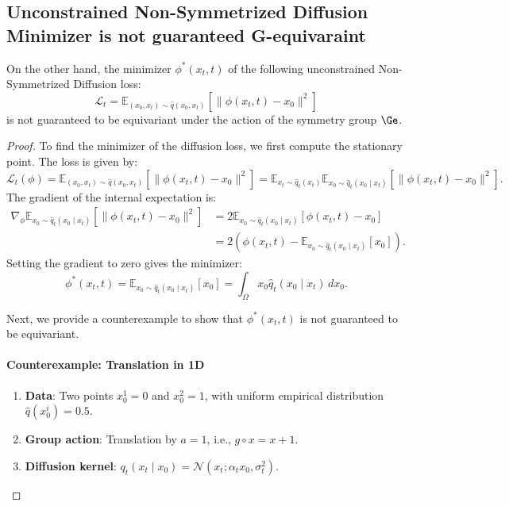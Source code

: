 \subsection{Unconstrained Non-Symmetrized Diffusion Minimizer is not guaranteed G-equivaraint}
\label{sub_app:non_sym_diff_mini}
  
On the other hand, the minimizer \(\phi^*(x_t, t)\) of the following unconstrained Non-Symmetrized Diffusion loss:
\[
    \mathcal{L}_t = \mathbb{E}_{(x_0, x_t) \sim \hat{q}(x_0, x_t)} [ \| \phi(x_t, t) - x_0 \|^2 ]
\]
is not guaranteed to be equivariant under the action of the symmetry group \(\Ge\).

\begin{proof}
To find the minimizer of the diffusion loss, we first compute the stationary point. The loss is given by:
\[
    \mathcal{L}_t(\phi) = \mathbb{E}_{(x_0, x_t) \sim \hat{q}(x_0, x_t)} \left[ \| \phi(x_t, t) - x_0 \|^2 \right] 
    = \mathbb{E}_{x_t \sim \hat{q}_t(x_t)} \mathbb{E}_{x_0 \sim \hat{q}_t(x_0 \mid x_t)} \left[ \| \phi(x_t, t) - x_0 \|^2 \right].
\]
The gradient of the internal expectation is:
\begin{align*}
    \nabla_\phi \mathbb{E}_{x_0 \sim \hat{q}_t(x_0 \mid x_t)} \left[ \| \phi(x_t, t) - x_0 \|^2 \right] 
    &= 2 \mathbb{E}_{x_0 \sim \hat{q}_t(x_0 \mid x_t)} \left[ \phi(x_t, t) - x_0 \right] \\
    &= 2 \left( \phi(x_t, t) - \mathbb{E}_{x_0 \sim \hat{q}_t(x_0 \mid x_t)}[x_0] \right).
\end{align*}
Setting the gradient to zero gives the minimizer:
\[
    \phi^*(x_t, t) = \mathbb{E}_{x_0 \sim \hat{q}_t(x_0 \mid x_t)}[x_0] 
    = \int_\Omega x_0 \hat{q}_t(x_0 \mid x_t) \, dx_0.
\]

Next, we provide a counterexample to show that \(\phi^*(x_t, t)\) is not guaranteed to be equivariant.

\paragraph{Counterexample: Translation in 1D}
\begin{enumerate}
    \item \textbf{Data}: Two points \(x_0^1 = 0\) and \(x_0^2 = 1\), with uniform empirical distribution \(\hat{q}(x_0^i) = 0.5\).
    \item \textbf{Group action}: Translation by \(a = 1\), i.e., \(g \circ x = x + 1\).
    \item \textbf{Diffusion kernel}: \({q}_t(x_t \mid x_0) = \mathcal{N}(x_t; \alpha_t x_0, \sigma_t^2)\).
\end{enumerate}


\end{proof}
